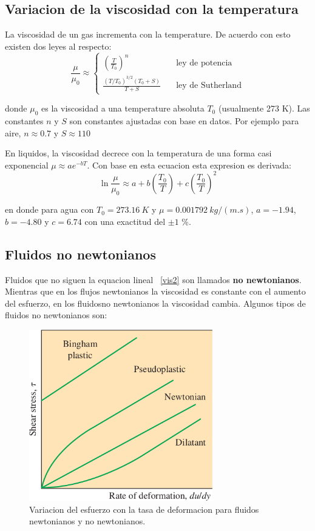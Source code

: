 \documentclass[10pt, oneside]{article}
\begin{document}
\subsection{Variacion de la viscosidad con la temperatura}
La viscosidad de un gas incrementa con la temperature. De acuerdo con esto existen dos leyes al respecto:
\begin{equation}
\frac{\mu}{\mu_0} \approx 
\begin{cases}
\left( \frac{T}{T_0} \right)^n & \quad \text{ley de potencia} \\
\frac{(T/T_0 )^{3/2}(T_0 + S)}{T+S} & \quad \text{ley de Sutherland} 
\end{cases}
\label{vist}
\end{equation}

donde $\mu_0$ es la viscosidad a una temperature absoluta $T_0$ (usualmente 273 K). Las constantes $n$ y $S$ son constantes ajustadas con base en datos. Por ejemplo para aire, $n\approx 0.7$ y $S\approx 110$ 

En liquidos, la viscosidad decrece con la temperatura de una forma casi exponencial $\mu \approx ae^{-bT}$. Con base en esta ecuacion esta expresion es derivada:
\begin{equation}
\ln \frac{\mu}{\mu_0} \approx  a + b \left(\frac{T_0}{T}\right)+ c\left(\frac{T_0}{T}\right)^2
\label{visf}
\end{equation}

en donde para agua con $T_0 = 273.16\ K$ y $\mu = 0.001792\ kg/(m.s)$, $a=-1.94$, $b=-4.80$ y $c=6.74$ con una  exactitud del $\pm 1$ \%.

\subsection{Fluidos no newtonianos}
Fluidos que no siguen la equacion lineal ~\ref{vis2} son llamados \textbf{no newtonianos}. Mientras que en los flujos newtonianos la viscosidad es constante con el aumento del esfuerzo, en los fluidosno newtonianos la viscosidad cambia. Algunos tipos de fluidos no newtonianos son:

\begin{figure}[h]
\centering
\includegraphics[width=8cm]{nonew}
\caption{Variacion del esfuerzo con la tasa de deformacion para fluidos newtonianos y no newtonianos.}
\label{nonew}
\end{figure}
\end{document}
